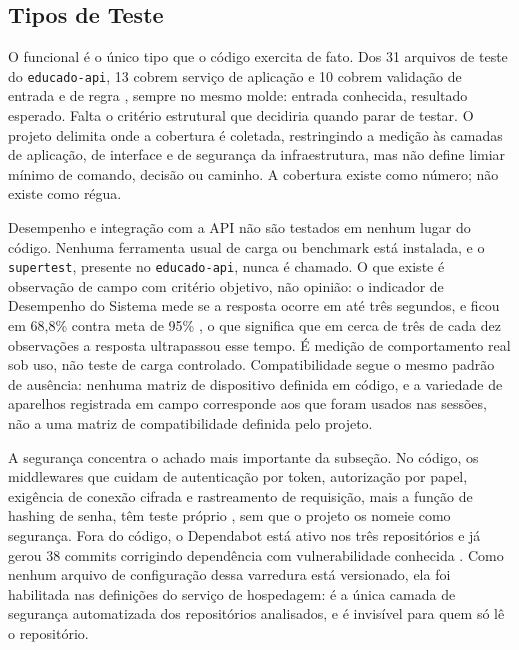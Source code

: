 
\subsection{Tipos de Teste}

O funcional é o único tipo que o código exercita de fato. Dos 31 arquivos de teste do
\texttt{educado-api}, 13 cobrem serviço de aplicação e 10 cobrem validação de
entrada e de regra \cite{educado-repos}, sempre no mesmo molde:
entrada conhecida, resultado esperado. Falta o critério estrutural que decidiria
quando parar de testar. O projeto delimita onde a cobertura é coletada, restringindo a medição às
camadas de aplicação, de interface e de segurança da infraestrutura, mas não
define limiar mínimo de comando,
decisão ou caminho. A cobertura existe como número; não existe como régua.

Desempenho e integração com a API não são testados em nenhum lugar do código.
Nenhuma ferramenta usual de carga ou benchmark está instalada, e o
\texttt{supertest}, presente no
\texttt{educado-api}, nunca é chamado. O que existe é observação de campo com
critério objetivo, não opinião: o indicador de Desempenho do Sistema mede se a
resposta ocorre em até três segundos, e ficou em 68,8\% contra meta de 95\%
\cite{dashboard}, o que significa que em cerca de três de cada dez observações a
resposta ultrapassou esse tempo. É medição de comportamento real sob uso, não
teste de carga controlado. Compatibilidade segue o mesmo padrão de ausência:
nenhuma matriz de dispositivo definida em código, e a variedade de aparelhos
registrada em campo corresponde aos que foram usados nas sessões, não a uma
matriz de compatibilidade definida pelo projeto.

A segurança concentra o achado mais importante da subseção. No código, os
middlewares que cuidam de autenticação por token, autorização por papel,
exigência de conexão cifrada e rastreamento de requisição, mais a função de
hashing de senha, têm teste próprio
\cite{educado-repos}, sem que o projeto os nomeie como segurança. Fora do código,
o Dependabot está ativo nos três repositórios e já gerou 38 commits corrigindo
dependência com vulnerabilidade conhecida \cite{educado-repos}. Como nenhum
arquivo de configuração dessa varredura está versionado, ela foi habilitada nas
definições do serviço de hospedagem: é a única camada de segurança automatizada
dos repositórios analisados, e é invisível para quem só lê o repositório.

